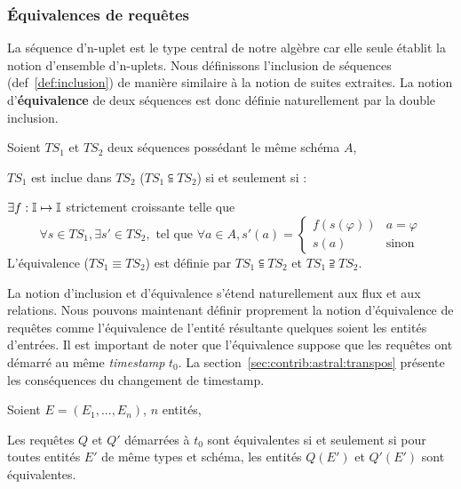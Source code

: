 \subsubsection{Équivalences de requêtes}
La séquence d'n-uplet est le type central de notre algèbre car elle seule établit la notion d'ensemble d'n-uplets. Nous définissons l'inclusion de séquences (def~\ref{def:inclusion}) de manière similaire à la notion de suites extraites. La notion d'\textbf{équivalence} de deux séquences est donc définie naturellement par la double inclusion. 
\begin{defi}\label{def:inclusion}
	Soient $TS_1$ et $TS_2$ deux séquences possédant le même schéma $A$,
	
	$TS_1$ est inclue dans $TS_2$ ($TS_1 \subseteqq TS_2$) si et seulement si : 
	
	\quad \quad $\exists f:\mathbb{I} \mapsto \mathbb{I}$ strictement croissante telle que 
$$\forall s\in TS_1, \exists s'\in TS_2, \textrm{ tel que } \forall a \in A, s'(a) = \begin{cases} f(s(\varphi)) & a = \varphi \\ s(a) & \textrm{sinon}\end{cases}$$
	L'équivalence ($TS_1 \equiv TS_2$) est définie par $TS_1 \subseteqq TS_2$ et $TS_1 \supseteqq TS_2$. 
\end{defi}%

La notion d'inclusion et d'équivalence s'étend naturellement aux flux et aux relations. Nous pouvons maintenant définir proprement la notion d'équivalence de requêtes comme l'équivalence de l'entité résultante quelques soient les entités d'entrées. Il est important de noter que l'équivalence suppose que les requêtes ont démarré au même \textit{timestamp} $t_0$. La section~\ref{sec:contrib:astral:transpos} présente les conséquences du changement de timestamp.
\begin{defi}\label{def:equivalence}
	Soient $E=(E_1, ..., E_n)$, $n$ entités,
	
	Les requêtes $Q$ et $Q'$ démarrées à $t_0$ sont équivalentes si et seulement si pour toutes entités $E'$ de même types et schéma, les entités $Q(E')$ et $Q'(E')$ sont équivalentes.
\end{defi}%

